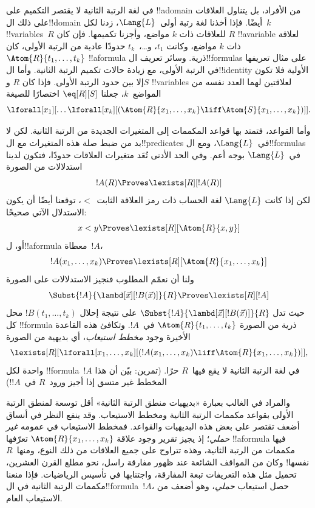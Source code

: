 \documentclass[../../../include/open-logic-section]{subfiles}
\begin{document}


في لغة الرتبة الثانية لا يقتصر التكميم على !!a{domain} من
الأفراد، بل يتناول العلاقات على ذلك ال!!{domain} أيضًا.
فإذا أخذنا لغة رتبة أولى~$\Lang{L}$، زدنا لكل~$k$
!!{variable}s~$R$ للعلاقات ذات $k$ مواضع، وأجزنا تكميمها.
فإن كان $R$ !!a{variable} لعلاقة ذات $k$ مواضع، وكانت
$t_1$، و\dots،~$t_k$ حدودًا عادية من الرتبة الأولى، كان
$\Atom{R}{t_1,\dots,t_k}$ !!a{formula} ذرية. وسائر تعريف
ال!!{formula}s على مثال تعريفها في الرتبة الأولى، مع زيادة
حالات تكميم الرتبة الثانية. وأما ال!!{identity} الأولية فلا
تكون إلا بين حدود الرتبة الأولى. فإذا كان $R$ و$S$
!!{variable}s لعلاقتين لهما العدد نفسه من المواضع~$k$،
جعلنا $\eq[R][S]$ اختصارًا للصيغة
\[
\lforall[x_1][\dots\lforall[x_k][(\Atom{R}{x_1, \dots, x_k} \liff
  \Atom{S}{x_1, \dots, x_k})]].
\]

وأما القواعد، فتمتد بها قواعد المكممات إلى المتغيرات الجديدة
من الرتبة الثانية. لكن لا بد من ضبط صلة هذه المتغيرات مع ال!!{predicate}s في~$\Lang{L}$، ومع
ال!!{formula}s في~$\Lang{L}$ بوجه أعم. وفي الحد الأدنى تُعَد متغيرات
العلاقات حدودًا، فتكون لدينا استدلالات من الصورة
\[
!A(R) \Proves \lexists[R][!A(R)]
\]
لكن إذا كانت $\Lang{L}$ لغة الحساب ذات رمز العلاقة الثابت~$<$، توقعنا
أيضًا أن يكون الاستدلال الآتي صحيحًا:
\[
x < y \Proves \lexists[R][\Atom{R}{x,y}]
\]
أو، ل!!a{formula} معطاة~$!A$،
\[
!A(x_1, \dots, x_k) \Proves \lexists[R][\Atom{R}{x_1,\dots,x_k}]
\]
ولنا أن نعمّم المطلوب فنجيز الاستدلالات على الصورة
\[
\Subst{!A}{\lambd[\vec x][!B(\vec x)]}{R} \Proves
\lexists[R][!A]
\]
حيث تدل $\Subst{!A}{\lambd[\vec x][!B(\vec x)]}{R}$ على نتيجة إحلال
$!B(t_1, \dots, t_k)$ محل كل !!{formula} ذرية من الصورة
$\Atom{R}{t_1,\dots,t_k}$ في~$!A$. وتكافئ هذه القاعدة الأخيرة وجود
{\em مخطط استيعاب}، أي بديهية من الصورة
\[
\lexists[R][\lforall[x_1, \dots, x_k][(!A(x_1, \dots, x_k) \liff
\Atom{R}{x_1, \dots, x_k})]],
\]
واحدة لكل !!{formula}~$!A$ في لغة الرتبة الثانية لا يقع فيها~$R$
حرًا. (تمرين: بيّن أن هذا المخطط غير متسق إذا أجيز ورود~$R$ في~$!A$!)

والمراد في الغالب بعبارة «بديهيات منطق الرتبة الثانية» أقل
توسعة لمنطق الرتبة الأولى بقواعد مكممات الرتبة الثانية ومخطط
الاستيعاب. وقد ينفع النظر في أنساق أضعف تقتصر على بعض هذه
البديهيات والقواعد. فمخطط الاستيعاب في عمومه \emph{غير حملي}؛
إذ يجيز تقرير وجود علاقة $\Atom{R}{x_1, \dots, x_k}$ تعرّفها
!!a{formula} فيها مكممات من الرتبة الثانية، وهذه تتراوح على
جميع العلاقات من ذلك النوع، ومنها~$R$ نفسها!{} وكان من
المواقف الشائعة عند ظهور مفارقة راسل، نحو مطلع القرن العشرين،
تحميل مثل هذه التعريفات تبعة المفارقة، واجتنابها في تأسيس
الرياضيات. فإذا منعنا مكممات الرتبة الثانية في
ال!!{formula}~$!A$، حصل استيعاب {\em حملي}، وهو أضعف من
الاستيعاب العام.
\end{document}
